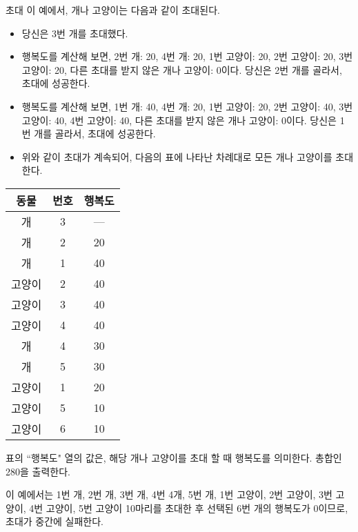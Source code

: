 \begin{problem}{초대}
	이 예에서, 개나 고양이는 다음과 같이 초대된다.
	
	\begin{itemize}
		\item 당신은 3번 개를 초대했다.
		\item 행복도를 계산해 보면, 2번 개: 20, 4번 개: 20, 1번 고양이: 20, 2번 고양이: 20, 3번 고양이: 20, 다른 초대를 받지 않은 개나 고양이: 0이다. 당신은 2번 개를 골라서, 초대에 성공한다.
		\item 행복도를 계산해 보면, 1번 개: 40, 4번 개: 20, 1번 고양이: 20, 2번 고양이: 40, 3번 고양이: 40, 4번 고양이: 40, 다른 초대를 받지 않은 개나 고양이: 0이다. 당신은 1번 개를 골라서, 초대에 성공한다.
		\item 위와 같이 초대가 계속되어, 다음의 표에 나타난 차례대로 모든 개나 고양이를 초대한다.
	\end{itemize}

	\begin{center}
	\begin{tabular}{|c|c|c|}
	\hline
	동물 & 번호 & 행복도 \\ \hline
	개 & 3 & --- \\ \hline
	개 & 2 & 20 \\ \hline
	개 & 1 & 40 \\ \hline
	고양이 & 2 & 40 \\ \hline
	고양이 & 3 & 40 \\ \hline
	고양이 & 4 & 40 \\ \hline
	개 & 4 & 30 \\ \hline
	개 & 5 & 30 \\ \hline
	고양이 & 1 & 20 \\ \hline
	고양이 & 5 & 10 \\ \hline
	고양이 & 6 & 10 \\ \hline
	\end{tabular}
	\end{center}
	
	표의 ``행복도" 열의 값은, 해당 개나 고양이를 초대 할 때 행복도를 의미한다. 총합인 280을 출력한다.
	
	\begin{example}
	\end{example}
	
	이 예에서는 1번 개, 2번 개, 3번 개, 4번 4개, 5번 개, 1번 고양이, 2번 고양이, 3번 고양이, 4번 고양이, 5번 고양이 10마리를 초대한 후 선택된 6번 개의 행복도가 0이므로, 초대가 중간에 실패한다.
	
	
\end{problem}

